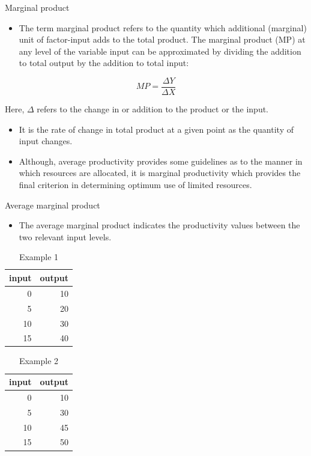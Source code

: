 \documentclass[12pt,ignorenonframetext,aspectratio=169]{beamer}
\providecommand{\tightlist}{%
  \setlength{\itemsep}{0pt}\setlength{\parskip}{0pt}}
\begin{document}
\begin{frame}{Marginal product}
\protect\hypertarget{marginal-product}{}
\begin{itemize}
\tightlist
\item
  The term marginal product refers to the quantity which additional
  (marginal) unit of factor-input adds to the total product. The
  marginal product (MP) at any level of the variable input can be
  approximated by dividing the addition to total output by the addition
  to total input:
\end{itemize}

\[
MP = \frac{\Delta Y}{\Delta X}
\]

Here, \(\Delta\) refers to the change in or addition to the product or
the input.

\begin{itemize}
\tightlist
\item
  It is the rate of change in total product at a given point as the
  quantity of input changes.
\item
  Although, average productivity provides some guidelines as to the
  manner in which resources are allocated, it is marginal productivity
  which provides the final criterion in determining optimum use of
  limited resources.
\end{itemize}
\end{frame}

\begin{frame}{Average marginal product}
\protect\hypertarget{average-marginal-product}{}
\begin{itemize}
\tightlist
\item
  The average marginal product indicates the productivity values between
  the two relevant input levels.
\end{itemize}

\begin{table}

\caption{\label{tab:marginal-product1}Example 1}
\centering
\fontsize{6}{8}\selectfont
\begin{tabular}[t]{rr}
\toprule
input & output\\
\midrule
0 & 10\\
5 & 20\\
10 & 30\\
15 & 40\\
\bottomrule
\end{tabular}
\end{table}

\begin{table}

\caption{\label{tab:marginal-product2}Example 2}
\centering
\fontsize{6}{8}\selectfont
\begin{tabular}[t]{rr}
\toprule
input & output\\
\midrule
0 & 10\\
5 & 30\\
10 & 45\\
15 & 50\\
\bottomrule
\end{tabular}
\end{table}
\end{frame}
\end{document}

